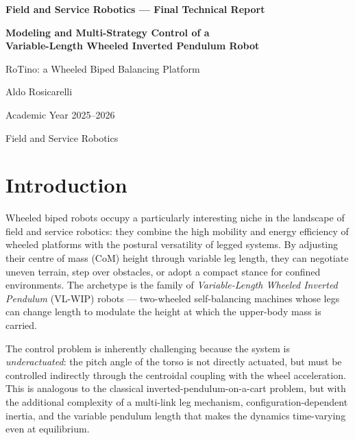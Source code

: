 \documentclass[11pt,a4paper]{article}
\begin{document}
\begin{titlepage}
    \centering
    \vspace*{2cm}
    {\Large\bfseries Field and Service Robotics --- Final Technical Report\par}
    \vspace{1.5cm}
    {\LARGE\bfseries Modeling and Multi-Strategy Control of a\\[6pt]
    Variable-Length Wheeled Inverted Pendulum Robot\par}
    \vspace{1cm}
    {\large RoTino: a Wheeled Biped Balancing Platform\par}
    \vspace{2cm}
    {\large Aldo Rosicarelli\par}
    \vspace{0.5cm}
    {\large Academic Year 2025--2026\par}
    \vfill
    {\large Field and Service Robotics\par}
\end{titlepage}

\tableofcontents
\newpage

\section{Introduction}
\label{sec:intro}

Wheeled biped robots occupy a particularly interesting niche in the landscape of field and
service robotics: they combine the high mobility and energy efficiency of wheeled platforms
with the postural versatility of legged systems.  By adjusting their centre of mass (CoM)
height through variable leg length, they can negotiate uneven terrain, step over obstacles,
or adopt a compact stance for confined environments.  The archetype is the family of
\emph{Variable-Length Wheeled Inverted Pendulum} (VL-WIP) robots --- two-wheeled
self-balancing machines whose legs can change length to modulate the height at which the
upper-body mass is carried.

The control problem is inherently challenging because the system is \emph{underactuated}:
the pitch angle of the torso is not directly actuated, but must be controlled indirectly
through the centroidal coupling with the wheel acceleration.  This is analogous to the
classical inverted-pendulum-on-a-cart problem, but with the additional complexity of a
multi-link leg mechanism, configuration-dependent inertia, and the variable pendulum length
that makes the dynamics time-varying even at equilibrium.
\end{document}
